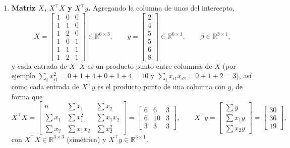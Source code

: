 \begin{enumerate}

\item \textbf{Matriz $X$, $X^\top X$ y $X^\top y$.}
Agregando la columna de unos del intercepto,
\[
    X = \begin{bmatrix}
        1 & 0 & 0\\ 1 & 1 & 0\\ 1 & 2 & 0\\ 1 & 0 & 1\\ 1 & 1 & 1\\ 1 & 2 & 1
    \end{bmatrix}\in\mathbb{R}^{6\times 3},
    \qquad
    y = \begin{bmatrix} 2\\4\\5\\5\\6\\8 \end{bmatrix}\in\mathbb{R}^{6\times 1},
    \qquad
    \beta\in\mathbb{R}^{3\times1},
\]
y cada entrada de $X^\top X$ es un producto punto entre columnas de $X$
(por ejemplo $\sum_i x_{i1}^2=0+1+4+0+1+4=10$ y
$\sum_i x_{i1}x_{i2}=0+1+2=3$), así como cada entrada de $X^\top y$ es
el producto punto de una columna con $y$, de forma que
\[
    X^\top X = \begin{bmatrix}
        n & \sum x_{1} & \sum x_{2}\\
        \sum x_{1} & \sum x_{1}^2 & \sum x_{1}x_{2}\\
        \sum x_{2} & \sum x_{1}x_{2} & \sum x_{2}^2
    \end{bmatrix}
    = \begin{bmatrix} 6 & 6 & 3\\ 6 & 10 & 3\\ 3 & 3 & 3 \end{bmatrix},
    \qquad
    X^\top y = \begin{bmatrix} \sum y\\ \sum x_1y\\ \sum x_2y \end{bmatrix}
    = \begin{bmatrix} 30\\ 36\\ 19 \end{bmatrix},
\]
con $X^\top X\in\mathbb{R}^{3\times3}$ (simétrica) y
$X^\top y\in\mathbb{R}^{3\times1}$.


\end{enumerate}
